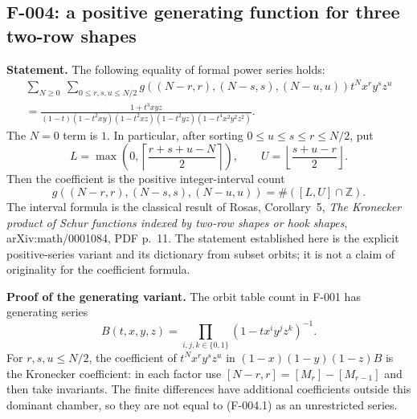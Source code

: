 \subsection{F-004: a positive generating function for three two-row shapes}
\textbf{Statement.}
The following equality of formal power series holds:
\[
\begin{gathered}
 \sum_{N\geq0}\ \sum_{0\leq r,s,u\leq N/2}
 g((N-r,r),(N-s,s),(N-u,u))t^Nx^ry^sz^u\\
 =\frac{1+t^3xyz}{(1-t)(1-t^2xy)(1-t^2xz)(1-t^2yz)
 (1-t^4x^2y^2z^2)}.
\end{gathered}                                      \tag{F-004.1}
\]
The $N=0$ term is $1$. In particular, after sorting $0\leq u\leq s\leq r\leq
N/2$, put
\[
 L=\max\left(0,\left\lceil\frac{r+s+u-N}{2}\right\rceil\right),\qquad
 U=\left\lfloor\frac{s+u-r}{2}\right\rfloor.
\]
Then the coefficient is the positive integer-interval count
\[
 g((N-r,r),(N-s,s),(N-u,u))=\#([L,U]\cap\mathbb Z).       \tag{F-004.2}
\]
The interval formula is the classical result of Rosas, Corollary~5,
\emph{The Kronecker product of Schur functions indexed by two-row shapes or
hook shapes}, arXiv:math/0001084, PDF p.~11. The statement established here
is the explicit positive-series variant and its dictionary from subset
orbits; it is not a claim of originality for the coefficient formula.

\textbf{Proof of the generating variant.}
The orbit table count in F-001 has generating series
\[
 B(t,x,y,z)=\prod_{i,j,k\in\{0,1\}}(1-tx^iy^jz^k)^{-1}.
\]
For $r,s,u\leq N/2$, the coefficient of $t^Nx^ry^sz^u$ in
$(1-x)(1-y)(1-z)B$ is the Kronecker coefficient: in each factor use
$[N-r,r]=[M_r]-[M_{r-1}]$ and then take invariants. The finite differences
have additional coefficients outside this dominant chamber, so they are
not equal to (F-004.1) as an unrestricted series.

